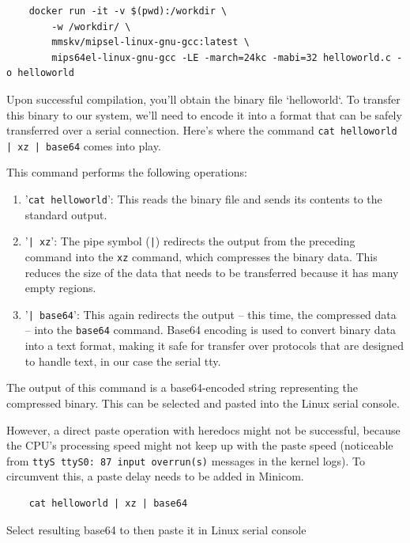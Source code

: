 \documentclass[a4paper]{article}
\let\oldtexttt\texttt
\renewcommand{\texttt}[1]{\textcolor{mygray}{\oldtexttt{#1}}}
\begin{document}
\begin{lstlisting}
    docker run -it -v $(pwd):/workdir \
        -w /workdir/ \
        mmskv/mipsel-linux-gnu-gcc:latest \
        mips64el-linux-gnu-gcc -LE -march=24kc -mabi=32 helloworld.c -o helloworld
\end{lstlisting}

Upon successful compilation, you'll obtain the binary file `helloworld`. To
transfer this binary to our system, we'll need to encode it into a format that
can be safely transferred over a serial connection. Here's where the command
\texttt{cat helloworld | xz | base64} comes into play.

This command performs the following operations:

\begin{enumerate}
    \itemsep0em
    \item '\texttt{cat helloworld}': This reads the binary file and sends its
        contents to the standard output.
    \item '\texttt{| xz}': The pipe symbol (\texttt{|}) redirects the output from
        the preceding command into the \texttt{xz} command, which compresses
        the binary data. This reduces the size of the data that needs to be
        transferred because it has many empty regions.
    \item '\texttt{| base64}': This again redirects the output -- this time, the
        compressed data -- into the \texttt{base64} command. Base64 encoding is
        used to convert binary data into a text format, making it safe for
        transfer over protocols that are designed to handle text, in our case
        the serial tty.
\end{enumerate}

The output of this command is a base64-encoded string representing the
compressed binary. This can be selected and pasted into the Linux serial
console.

However, a direct paste operation with heredocs might not be successful,
because the CPU's processing speed might not keep up with the paste speed
(noticeable from \texttt{ttyS ttyS0: 87 input overrun(s)} messages in the
kernel logs). To circumvent this, a paste delay needs to be added in Minicom.

\begin{lstlisting}
    cat helloworld | xz | base64
\end{lstlisting}

Select resulting base64 to then paste it in Linux serial console
\end{document}

